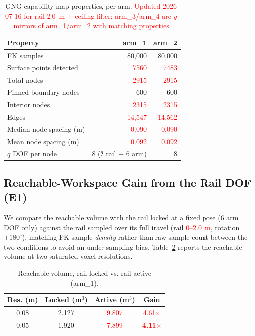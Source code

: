 \documentclass[conference]{IEEEtran}
\begin{document}
\begin{table}[htbp]
\caption{GNG capability map properties, per arm. \textcolor{red}{Updated 2026-07-16 for rail 2.0~m + ceiling filter; arm\_3/arm\_4 are $y$-mirrors of arm\_1/arm\_2 with matching properties.}}
\begin{center}
\begin{tabular}{|l|r|r|}
\hline
\textbf{Property} & \textbf{arm\_1} & \textbf{arm\_2} \\
\hline
FK samples & 80{,}000 & 80{,}000 \\
\hline
Surface points detected & \textcolor{red}{7560} & \textcolor{red}{7483} \\
\hline
Total nodes & \textcolor{red}{2915} & \textcolor{red}{2915} \\
\hline
Pinned boundary nodes & 600 & 600 \\
\hline
Interior nodes & \textcolor{red}{2315} & \textcolor{red}{2315} \\
\hline
Edges & \textcolor{red}{14{,}547} & \textcolor{red}{14{,}562} \\
\hline
Median node spacing (m) & \textcolor{red}{0.090} & \textcolor{red}{0.090} \\
\hline
Mean node spacing (m) & \textcolor{red}{0.092} & \textcolor{red}{0.092} \\
\hline
$q$ DOF per node & 8 (2 rail + 6 arm) & 8 \\
\hline
\end{tabular}
\label{tab:e0}
\end{center}
\end{table}

\subsection{Reachable-Workspace Gain from the Rail DOF (E1)}

We compare the reachable volume with the rail locked at a fixed pose (6 arm DOF
only) against the rail sampled over its full travel (rail \textcolor{red}{0--2.0~m}, rotation
$\pm180^{\circ}$), matching FK sample \emph{density} rather than raw sample count
between the two conditions to avoid an under-sampling bias. Table~\ref{tab:e1}
reports the reachable volume at two saturated voxel resolutions.

\begin{table}[htbp]
\caption{Reachable volume, rail locked vs. rail active (arm\_1).}
\begin{center}
\begin{tabular}{|c|c|c|c|}
\hline
\textbf{Res. (m)} & \textbf{Locked (m$^3$)} & \textbf{Active (m$^3$)} & \textbf{Gain} \\
\hline
0.08 & 2.127 & \textcolor{red}{9.807} & \textcolor{red}{4.61$\times$} \\
\hline
0.05 & 1.920 & \textcolor{red}{7.899} & \textcolor{red}{\textbf{4.11$\times$}} \\
\hline
\end{tabular}
\label{tab:e1}
\end{center}
\end{table}
\end{document}
